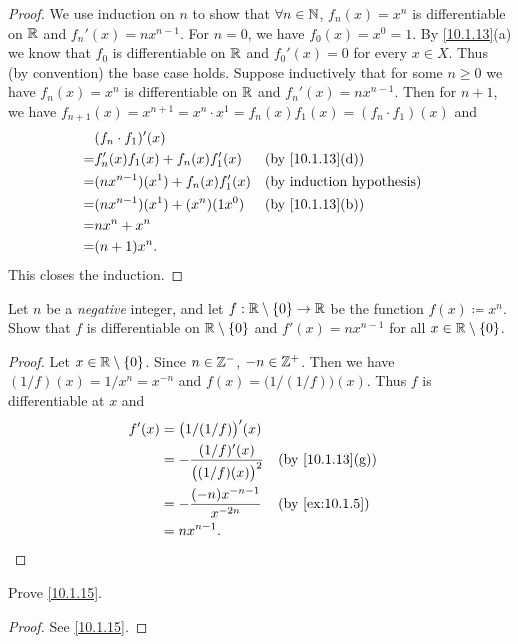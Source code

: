 \begin{proof}
  We use induction on \(n\) to show that \(\forall n \in \mathbb{N}\), \(f_n(x) = x^n\) is differentiable on \(\mathbb{R}\) and \(f_n'(x) = n x^{n - 1}\).
  For \(n = 0\), we have \(f_0(x) = x^0 = 1\).
  By \cref{10.1.13}(a) we know that \(f_0\) is differentiable on \(\mathbb{R}\) and \(f_0'(x) = 0\) for every \(x \in X\).
  Thus (by convention) the base case holds.
  Suppose inductively that for some \(n \geq 0\) we have \(f_n(x) = x^n\) is differentiable on \(\mathbb{R}\) and \(f_n'(x) = n x^{n - 1}\).
  Then for \(n + 1\), we have \(f_{n + 1}(x) = x^{n + 1} = x^n \cdot x^1 = f_n(x) f_1(x) = (f_n \cdot f_1)(x)\) and
  \begin{align*}
      & (f_n \cdot f_1)'(x)                                                    \\
    = & f_n'(x) f_1(x) + f_n(x) f_1'(x)     &  & \text{(by \cref{10.1.13}(d))} \\
    = & (n x^{n - 1})(x^1) + f_n(x) f_1'(x) &  & \byIH                         \\
    = & (n x^{n - 1})(x^1) + (x^n)(1 x^0)   &  & \text{(by \cref{10.1.13}(b))} \\
    = & n x^n + x^n                                                            \\
    = & (n + 1) x^n.
  \end{align*}
  This closes the induction.
\end{proof}

\begin{ex}\label{ex:10.1.6}
  Let \(n\) be a \emph{negative} integer, and let \(f : \mathbb{R} \setminus \left\lbrace0\right\rbrace \to \mathbb{R}\) be the function \(f(x) \coloneqq x^n\).
  Show that \(f\) is differentiable on \(\mathbb{R} \setminus \left\lbrace0\right\rbrace\) and \(f'(x) = n x^{n - 1}\) for all \(x \in \mathbb{R} \setminus \left\lbrace0\right\rbrace\).
\end{ex}

\begin{proof}
  Let \(x \in \mathbb{R} \setminus \left\lbrace0\right\rbrace\).
  Since \(n \in \mathbb{Z}^-\), \(-n \in \mathbb{Z}^+\).
  Then we have \((1 / f)(x) = 1 / x^n = x^{-n}\) and \(f(x) = \big(1 / (1 / f)\big)(x)\).
  Thus \(f\) is differentiable at \(x\) and
  \begin{align*}
    f'(x) & = \big(1 / (1 / f)\big)'(x)                                                       \\
          & = -\dfrac{(1 / f)'(x)}{\big((1 / f)(x)\big)^2} &  & \text{(by \cref{10.1.13}(g))} \\
          & = -\dfrac{(-n) x^{-n - 1}}{x^{-2n}}            &  & \by{ex:10.1.5}                \\
          & = n x^{n - 1}.
  \end{align*}
\end{proof}

\begin{ex}\label{ex:10.1.7}
  Prove \cref{10.1.15}.
\end{ex}

\begin{proof}
  See \cref{10.1.15}.
\end{proof}
